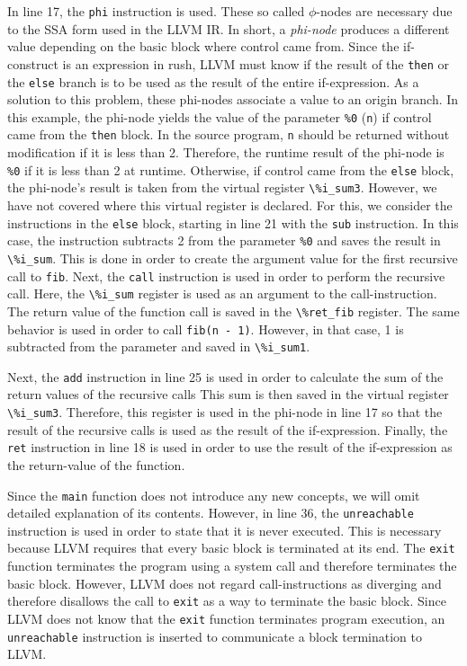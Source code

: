 In line 17, the \texttt{phi} instruction is used.
These so called $\phi$-nodes are necessary due to the SSA form used in the LLVM IR\@.
In short, a \emph{phi-node} produces a different value depending on the basic block where control came from.
Since the if-construct is an expression in rush, LLVM must know if the result of the \texttt{then} or the \texttt{else} branch is to be used as the result of the entire if-expression.
As a solution to this problem, these phi-nodes associate a value to an origin branch.
In this example, the phi-node yields the value of the parameter \texttt{\%0} (\texttt{n}) if control came from the \texttt{then} block.
In the source program, \texttt{n} should be returned without modification if it is less than 2.
Therefore, the runtime result of the phi-node is \texttt{\%0} if it is less than 2 at runtime.
Otherwise, if control came from the \texttt{else} block, the phi-node's result is taken from the virtual register \Verb|\%i_sum3|.
However, we have not covered where this virtual register is declared.
For this, we consider the instructions in the \texttt{else} block, starting in line 21 with the \texttt{sub} instruction.
In this case, the instruction subtracts 2 from the parameter \texttt{\%0} and saves the result in \Verb|\%i_sum|.
This is done in order to create the argument value for the first recursive call to \texttt{fib}.
Next, the \texttt{call} instruction is used in order to perform the recursive call.
Here, the \Verb|\%i_sum| register is used as an argument to the call-instruction.
The return value of the function call is saved in the \Verb|\%ret_fib| register.
The same behavior is used in order to call \texttt{fib(n - 1)}.
However, in that case, 1 is subtracted from the parameter and saved in \Verb|\%i_sum1|.

Next, the \texttt{add} instruction in line 25 is used in order to calculate the sum of the return values of the recursive calls
This sum is then saved in the virtual register \Verb|\%i_sum3|.
Therefore, this register is used in the phi-node in line 17 so that the result of the recursive calls is used as the result of the if-expression.
Finally, the \texttt{ret} instruction in line 18 is used in order to use the result of the if-expression as the return-value of the function.

Since the \texttt{main} function does not introduce any new concepts, we will omit detailed explanation of its contents.
However, in line 36, the \texttt{unreachable} instruction is used in order to state that it is never executed.
This is necessary because LLVM requires that every basic block is terminated at its end.
The \texttt{exit} function terminates the program using a system call and therefore terminates the basic block.
However, LLVM does not regard call-instructions as diverging and therefore disallows the call to \texttt{exit} as a way to terminate the basic block.
Since LLVM does not know that the \texttt{exit} function terminates program execution, an \texttt{unreachable}  instruction is inserted to communicate a block termination to LLVM.

